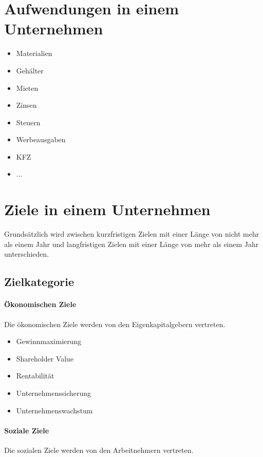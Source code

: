 \documentclass[../main.tex]{subfiles}
\begin{document}
    \section{Aufwendungen in einem Unternehmen}
        \begin{itemize}
            \item Materialien
            \item Gehälter
            \item Mieten
            \item Zinsen
            \item Steuern
            \item Werbeausgaben
            \item KFZ
            \item ...
        \end{itemize}
        
    \section{Ziele in einem Unternehmen}
        Grundsätzlich wird zwischen kurzfristigen Zielen mit einer Länge von nicht mehr als einem Jahr und langfristigen Zielen mit einer Länge von mehr als einem Jahr unterschieden.
        
        \subsection{Zielkategorie}
            \paragraph{Ökonomischen Ziele}
                Die ökonomischen Ziele werden von den Eigenkapitalgebern vertreten.
                
                \begin{itemize}
                    \item Gewinnmaximierung
                    \item Shareholder Value
                    \item Rentabilität
                    \item Unternehmenssicherung
                    \item Unternehmenswachstum
                \end{itemize}
                
            \paragraph{Soziale Ziele}
                Die sozialen Ziele werden von den Arbeitnehmern vertreten.
\end{document}
